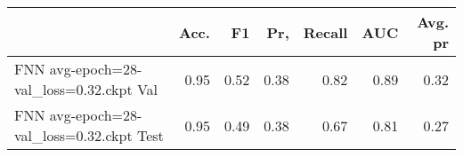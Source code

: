 \begin{tabular}{lrrrrrr}
\toprule
{} &  Acc. &    F1 &   Pr, &  Recall &   AUC &  Avg. pr \\
\midrule
FNN avg-epoch=28-val\_loss=0.32.ckpt Val  &  0.95 &  0.52 &  0.38 &    0.82 &  0.89 &     0.32 \\
FNN avg-epoch=28-val\_loss=0.32.ckpt Test &  0.95 &  0.49 &  0.38 &    0.67 &  0.81 &     0.27 \\
\bottomrule
\end{tabular}
